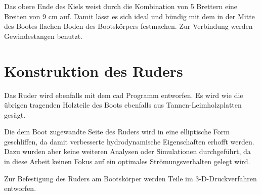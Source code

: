 Das obere Ende des Kiels weist durch die Kombination von 5 Brettern eine Breiten von 9 cm auf. Damit lässt es sich ideal und bündig mit dem in der Mitte des Bootes flachen Boden des Bootskörpers festmachen. Zur Verbindung werden Gewindestangen benutzt.

\section{Konstruktion des Ruders}
Das Ruder wird ebenfalls mit dem \ac{cad} Programm entworfen. Es wird wie die übrigen tragenden Holzteile des Boots ebenfalls aus Tannen-Leimholzplatten gesägt.

Die dem Boot zugewandte Seite des Ruders wird in eine elliptische Form geschliffen, da damit verbesserte hydrodynamische Eigenschaften erhofft werden. Dazu wurden aber keine weiteren Analysen oder Simulationen durchgeführt, da in diese Arbeit keinen Fokus auf ein optimales Strömungsverhalten gelegt wird.

Zur Befestigung des Ruders am Bootskörper werden Teile im 3-D-Druckverfahren entworfen.